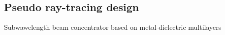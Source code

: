 \documentclass{beamer}
\begin{document}
\begin{frame}[t]
\begin{columns}
\begin{column}{0.5\textwidth}
		\end{column}
	\end{columns}
	{\tiny \cite{prism2010}}
		
\end{frame}

\subsection{Pseudo ray-tracing design}

\begin{frame}
Subwawelength beam concentrator based on metal-dielectric multilayers
	\begin{columns}
		\begin{column}{0.5\textwidth}
			\begin{figure}

\end{figure}
\end{column}
\end{columns}
\end{frame}
\end{document}

